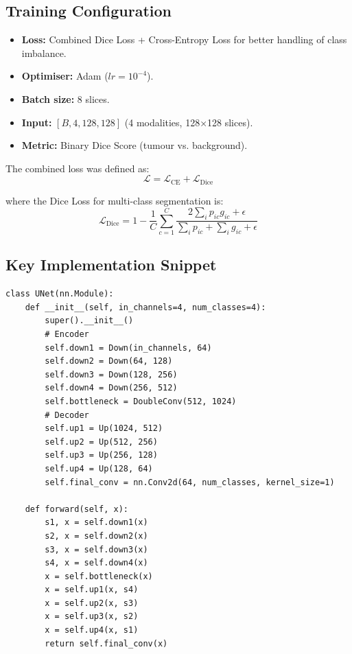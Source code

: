 \documentclass[12pt,a4paper]{report}
\begin{document}
\subsection{Training Configuration}

\begin{itemize}[leftmargin=*]
    \item \textbf{Loss:} Combined Dice Loss + Cross-Entropy Loss for better handling of class imbalance.
    \item \textbf{Optimiser:} Adam ($lr = 10^{-4}$).
    \item \textbf{Batch size:} 8 slices.
    \item \textbf{Input:} $[B, 4, 128, 128]$ (4 modalities, 128×128 slices).
    \item \textbf{Metric:} Binary Dice Score (tumour vs. background).
\end{itemize}

The combined loss was defined as:
\begin{equation}
\mathcal{L} = \mathcal{L}_{\text{CE}} + \mathcal{L}_{\text{Dice}}
\end{equation}

where the Dice Loss for multi-class segmentation is:
\begin{equation}
\mathcal{L}_{\text{Dice}} = 1 - \frac{1}{C}\sum_{c=1}^{C} \frac{2\sum_i p_{ic} g_{ic} + \epsilon}{\sum_i p_{ic} + \sum_i g_{ic} + \epsilon}
\end{equation}

\subsection{Key Implementation Snippet}

\begin{lstlisting}[caption={Core U-Net forward pass implementation}, label={lst:unet_forward}]
class UNet(nn.Module):
    def __init__(self, in_channels=4, num_classes=4):
        super().__init__()
        # Encoder
        self.down1 = Down(in_channels, 64)
        self.down2 = Down(64, 128)
        self.down3 = Down(128, 256)
        self.down4 = Down(256, 512)
        self.bottleneck = DoubleConv(512, 1024)
        # Decoder
        self.up1 = Up(1024, 512)
        self.up2 = Up(512, 256)
        self.up3 = Up(256, 128)
        self.up4 = Up(128, 64)
        self.final_conv = nn.Conv2d(64, num_classes, kernel_size=1)

    def forward(self, x):
        s1, x = self.down1(x)
        s2, x = self.down2(x)
        s3, x = self.down3(x)
        s4, x = self.down4(x)
        x = self.bottleneck(x)
        x = self.up1(x, s4)
        x = self.up2(x, s3)
        x = self.up3(x, s2)
        x = self.up4(x, s1)
        return self.final_conv(x)
\end{lstlisting}
\end{document}
